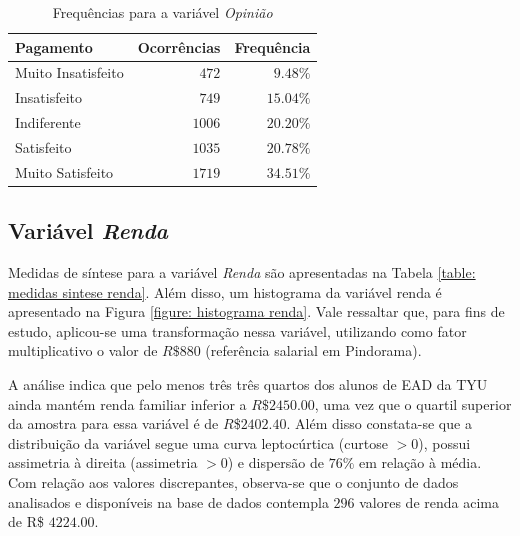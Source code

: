 \documentclass[10pt,a4paper,oneside]{article}
\begin{document}
\begin{table}[h]
\small
\centering
\caption{Frequências para a variável \textit{Opinião}}
\label{table: frequencias opiniao}
\vspace{0.5em}
\begin{tabular}{l r r}
	\toprule
	\textbf{Pagamento}     & \textbf{Ocorrências} & \textbf{Frequência} \\
	\midrule
	Muito Insatisfeito     & $472$                & $9.48\%$            \\
	Insatisfeito           & $749$                & $15.04\%$           \\
	Indiferente            & $1006$               & $20.20\%$           \\
	Satisfeito             & $1035$               & $20.78\%$           \\
	Muito Satisfeito       & $1719$               & $34.51\%$           \\
	\bottomrule
\end{tabular}
\end{table}

\subsection*{Variável \textit{Renda}}

Medidas de síntese para a variável \textit{Renda} são apresentadas na Tabela \ref{table: medidas sintese renda}. Além disso, um histograma da variável renda é apresentado na Figura \ref{figure: histograma renda}. Vale ressaltar que, para fins de estudo, aplicou-se uma transformação nessa variável, utilizando como fator multiplicativo o valor de $R\$880$ (referência salarial em Pindorama). 

A análise indica que pelo menos três três quartos dos alunos de EAD da TYU ainda mantém renda familiar inferior a $R\$2450.00$, uma vez que o quartil superior da amostra para essa variável é de $R$\$$2402.40$. Além disso constata-se que a distribuição da variável segue uma curva leptocúrtica (curtose $> 0$), possui assimetria à direita (assimetria $> 0$) e dispersão de $76\%$ em relação à média. Com relação aos valores discrepantes, observa-se que o conjunto de dados analisados e disponíveis na base de dados contempla $296$ valores de renda acima de R\$ $4224.00$.
\end{document}
